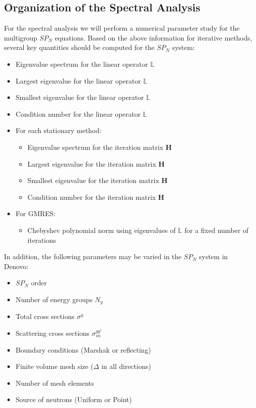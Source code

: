 \documentclass[letterpaper,12pt]{article}
\begin{document}
\subsection{Organization of the Spectral Analysis}
\label{subsec:spectral_organization}
For the spectral analysis we will perform a numerical parameter study
for the multigroup $SP_N$ equations. Based on the above information
for iterative methods, several key quantities should be computed for
the $SP_N$ system:
\begin{itemize}
\item Eigenvalue spectrum for the linear operator $\mathbb{L}$
\item Largest eigenvalue for the linear operator $\mathbb{L}$
\item Smallest eigenvalue for the linear operator $\mathbb{L}$
\item Condition number for the linear operator $\mathbb{L}$
\item For each stationary method:
  \begin{itemize}
  \item Eigenvalue spectrum for the iteration matrix $\mathbf{H}$
  \item Largest eigenvalue for the iteration matrix $\mathbf{H}$
  \item Smallest eigenvalue for the iteration matrix $\mathbf{H}$
  \item Condition number for the iteration matrix $\mathbf{H}$
  \end{itemize}
\item For GMRES:
  \begin{itemize}
  \item Chebyshev polynomial norm using eigenvalues of $\mathbb{L}$
    for a fixed number of iterations
  \end{itemize}
\end{itemize}
In addition, the following parameters may be varied in the $SP_N$
system in Denovo:
\begin{itemize}
  \item $SP_N$ order
  \item Number of energy groups $N_g$
  \item Total cross sections $\sigma^g$
  \item Scattering cross sections $\sigma_{sn}^{gg'}$
  \item Boundary conditions (Marshak or reflecting)
  \item Finite volume mesh size ($\Delta$ in all directions)
  \item Number of mesh elements
  \item Source of neutrons (Uniform or Point)
\end{itemize}
\end{document}
